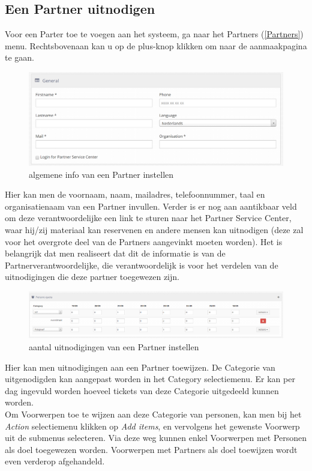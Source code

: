 \documentclass[]{memoir}
\begin{document}
\subsection{Een Partner uitnodigen} \label{AddPartner}
Voor een Parter toe te voegen aan het systeem, ga naar het Partners (\ref{Partners}) menu. Rechtsbovenaan kan u op de plus-knop klikken om naar de aanmaakpagina te gaan.
\begin{figure}[H]
	\includegraphics[width=\linewidth]{addPartner_general}
	\caption{algemene info van een Partner instellen}
\end{figure}
Hier kan men de voornaam, naam, mailadres, telefoonnummer, taal en organisatienaam van een Partner invullen. Verder is er nog aan aantikbaar veld om deze verantwoordelijke een link te sturen naar het Partner Service Center, waar hij/zij materiaal kan reservenen en andere mensen kan uitnodigen (deze zal voor het overgrote deel van de Partners aangevinkt moeten worden). Het is belangrijk dat men realiseert dat dit de informatie is van de Partnerverantwoordelijke, die verantwoordelijk is voor het verdelen van de uitnodigingen die deze partner toegewezen zijn.
\begin{figure}[H]
	\includegraphics[width=\linewidth]{addPartner_date}
	\caption{aantal uitnodigingen van een Partner instellen}
	\label{img:Partnerdate}
\end{figure}
Hier kan men uitnodigingen aan een Partner toewijzen. De Categorie van uitgenodigden kan aangepast worden in het Category selectiemenu. Er kan per dag ingevuld worden hoeveel tickets van deze Categorie uitgedeeld kunnen worden. \\  Om Voorwerpen toe te wijzen aan deze Categorie van personen, kan men bij het \textsl{Action} selectiemenu klikken op \textsl{Add items}, en vervolgens het gewenste Voorwerp uit de submenus selecteren. Via deze weg kunnen enkel Voorwerpen met Personen als doel toegewezen worden. Voorwerpen met Partners als doel toewijzen wordt even verderop afgehandeld. \\
\end{document}
